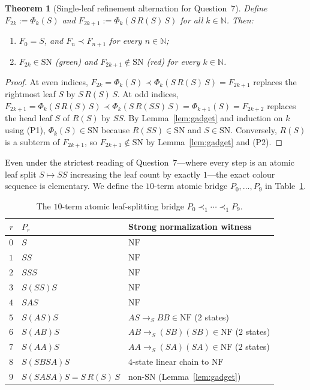 \documentclass[11pt,reqno]{amsart}
\newtheorem{theorem}{Theorem}[section]
\theoremstyle{definition}
\theoremstyle{remark}
\newcommand{\SN}{\mathrm{SN}}
\newcommand{\NF}{\mathrm{NF}}
\newcommand{\toS}{\to_S}
\begin{document}
\begin{theorem}[Single-leaf refinement alternation for Question~7]\label{thm:q7-flip}
Define $F_{2k} := \Phi_k(S)$ and $F_{2k+1} := \Phi_k(S\,R(S)\,S)$ for all $k \in \mathbb{N}$. Then:
\begin{enumerate}
  \item $F_0 = S$, and $F_n \prec F_{n+1}$ for every $n \in \mathbb{N}$;
  \item $F_{2k} \in \SN$ (green) and $F_{2k+1} \notin \SN$ (red) for every $k \in \mathbb{N}$.
\end{enumerate}
\end{theorem}

\begin{proof}
At even indices, $F_{2k} = \Phi_k(S) \prec \Phi_k(S\,R(S)\,S) = F_{2k+1}$ replaces the rightmost leaf $S$ by $S\,R(S)\,S$. At odd indices, $F_{2k+1} = \Phi_k(S\,R(S)\,S) \prec \Phi_k(S\,R(S S)\,S) = \Phi_{k+1}(S) = F_{2k+2}$ replaces the head leaf $S$ of $R(S)$ by $S S$. By Lemma~\ref{lem:gadget} and induction on $k$ using (P1), $\Phi_k(S) \in \SN$ because $R(S S) \in \SN$ and $S \in \SN$. Conversely, $R(S)$ is a subterm of $F_{2k+1}$, so $F_{2k+1} \notin \SN$ by Lemma~\ref{lem:gadget} and (P2).
\end{proof}

Even under the strictest reading of Question~7---where every step is an atomic leaf split $S \mapsto S S$ increasing the leaf count by exactly $1$---the exact colour sequence is elementary. We define the $10$-term atomic bridge $P_0, \dots, P_9$ in Table~\ref{tab:atomic-bridge}.

\begin{table}[h]
\centering
\caption{The $10$-term atomic leaf-splitting bridge $P_0 \prec_1 \cdots \prec_1 P_9$.}\label{tab:atomic-bridge}
\begin{tabular}{rll}
\toprule
$r$ & $P_r$ & Strong normalization witness \\
\midrule
$0$ & $S$ & $\NF$ \\
$1$ & $S S$ & $\NF$ \\
$2$ & $S S S$ & $\NF$ \\
$3$ & $S (S S) S$ & $\NF$ \\
$4$ & $S A S$ & $\NF$ \\
$5$ & $S (A S) S$ & $A S \toS B B \in \NF$ ($2$ states) \\
$6$ & $S (A B) S$ & $A B \toS (S B)(S B) \in \NF$ ($2$ states) \\
$7$ & $S (A A) S$ & $A A \toS (S A)(S A) \in \NF$ ($2$ states) \\
$8$ & $S (S B S A) S$ & $4$-state linear chain to $\NF$ \\
$9$ & $S (S A S A) S = S\,R(S)\,S$ & non-$\SN$ (Lemma~\ref{lem:gadget}) \\
\bottomrule
\end{tabular}
\end{table}
\end{document}
